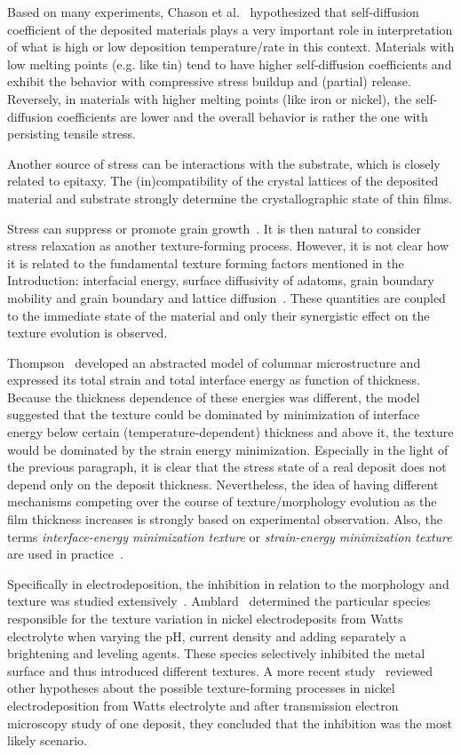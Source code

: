 Based on many experiments, Chason et al.~\cite{Chason2002, Chason2015} hypothesized that self-diffusion coefficient of the deposited materials plays a very important role in interpretation of what is high or low deposition temperature/rate in this context. Materials with low melting points (e.g. like tin) tend to have higher self-diffusion coefficients and exhibit the behavior with compressive stress buildup and (partial) release. Reversely, in materials with higher melting points (like iron or nickel), the self-diffusion coefficients are lower and the overall behavior is rather the one with persisting tensile stress. 

Another source of stress can be interactions with the substrate, which is closely related to epitaxy. The (in)compatibility of the crystal lattices of the deposited material and substrate strongly determine the crystallographic state of thin films.

Stress can suppress or promote grain growth~\cite{Thompson1993}. It is then natural to consider stress relaxation as another texture-forming process. However, it is not clear how it is related to the fundamental texture forming factors mentioned in the Introduction: interfacial energy, surface diffusivity of adatoms, grain boundary mobility and grain boundary and lattice diffusion~\cite{Szpunar1997, Suwas2014}. These quantities are coupled to the immediate state of the material and only their synergistic effect on the texture evolution is observed.

Thompson~\cite{Thompson1993} developed an abstracted model of columnar microstructure and expressed its total strain and total interface energy as function of thickness. Because the thickness dependence of these energies was different, the model suggested that the texture could be dominated by minimization of interface energy below certain (temperature-dependent) thickness and above it, the texture would be dominated by the strain energy minimization. Especially in the light of the previous paragraph, it is clear that the stress state of a real deposit does not depend only on the deposit thickness. Nevertheless, the idea of having different mechanisms competing over the course of texture/morphology evolution as the film thickness increases is strongly based on experimental observation. Also, the terms \textit{interface-energy minimization texture} or \textit{strain-energy minimization texture} are used in practice~\cite{Alimadadi2016}.

Specifically in electrodeposition, the inhibition in relation to the morphology and texture was studied extensively~\cite{Winand1992}. Amblard~\cite{Amblard1979} determined the particular species responsible for the texture variation in nickel electrodeposits from Watts electrolyte when varying the pH, current density and adding separately a brightening and leveling agents. These species selectively inhibited the metal surface and thus introduced different textures. A more recent study~\cite{BergenstofNielsen1997} reviewed other hypotheses about the possible texture-forming processes in nickel electrodeposition from Watts electrolyte and after transmission electron microscopy study of one deposit, they concluded that the inhibition was the most likely scenario. 


